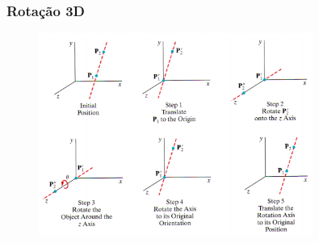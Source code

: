 \documentclass{beamer}
\begin{document}
\begin{frame}
\frametitle{Rotação 3D}


	\begin{figure}[!h]
			\begin{center}
			\includegraphics[width=0.8\textwidth]{Figures/RoteEixGeral}
			\end{center}
	\end{figure}
	
\end{frame}
\end{document}
